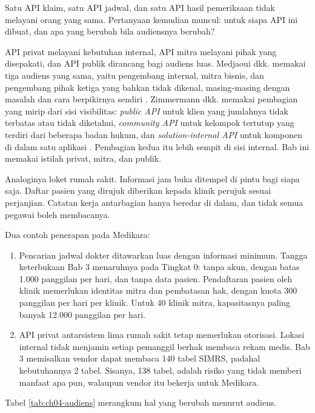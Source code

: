 Satu API klaim, satu API jadwal, dan satu API hasil pemeriksaan tidak melayani orang yang sama. Pertanyaan
kemudian muncul: untuk siapa API ini dibuat, dan apa yang berubah bila audiensnya berubah?

API privat melayani kebutuhan internal, API mitra melayani pihak yang disepakati, dan API publik
dirancang bagi audiens luas. Medjaoui dkk. memakai tiga audiens yang sama, yaitu pengembang
internal, mitra bisnis, dan pengembang pihak ketiga yang bahkan tidak dikenal, masing-masing dengan masalah dan cara berpikirnya
sendiri \cite{medjaoui2021continuous}. Zimmermann dkk. memakai pembagian yang mirip dari sisi
visibilitas: \textit{public API} untuk klien yang jumlahnya tidak terbatas atau tidak diketahui,
\textit{community API} untuk kelompok tertutup yang terdiri dari beberapa badan hukum, dan
\textit{solution-internal API} untuk komponen di dalam satu aplikasi \cite{zimmermann2022patterns}.
Pembagian kedua itu lebih sempit di sisi internal. Bab ini memakai istilah privat, mitra, dan publik.

Analoginya loket rumah sakit. Informasi jam buka ditempel di pintu bagi siapa saja. Daftar pasien yang
dirujuk diberikan kepada klinik perujuk sesuai perjanjian. Catatan kerja antarbagian hanya beredar di
dalam, dan tidak semua pegawai boleh membacanya.

Dua contoh penerapan pada Medikara:
\begin{enumerate}
  \item Pencarian jadwal dokter ditawarkan luas dengan informasi minimum. Tangga keterbukaan Bab 3
        menaruhnya pada Tingkat 0: tanpa akun, dengan batas 1.000 panggilan per hari, dan tanpa data
        pasien. Pendaftaran pasien oleh klinik memerlukan identitas mitra dan pembatasan hak, dengan
        kuota 300 panggilan per hari per klinik. Untuk 40 klinik mitra, kapasitasnya paling banyak
        12.000 panggilan per hari.
  \item API privat antarsistem lima rumah sakit tetap memerlukan otorisasi. Lokasi internal tidak
        menjamin setiap pemanggil berhak membaca rekam medis. Bab 3 memisalkan vendor dapat membaca 140
        tabel SIMRS, padahal kebutuhannya 2 tabel. Sisanya, 138 tabel, adalah risiko yang tidak memberi
        manfaat apa pun, walaupun vendor itu bekerja untuk Medikara.
\end{enumerate}

Tabel \ref{tab:ch04-audiens} merangkum hal yang berubah menurut audiens.

